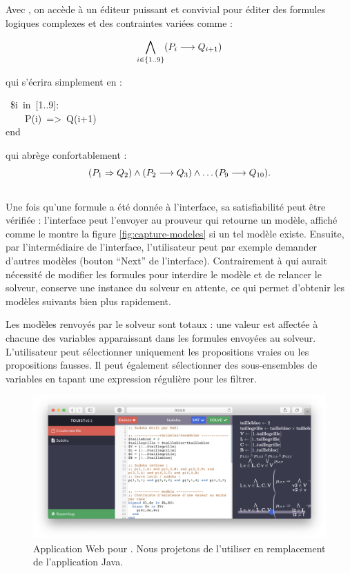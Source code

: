 Avec \touist , on accède à un éditeur puissant et convivial pour éditer des formules logiques complexes et des contraintes variées comme :

\[\bigwedge_{i \in \{1..9\}} (P_i \longrightarrow Q_{i+1})\]

\noindent
qui s'écrira simplement en \touist :
\begin{mdpre}%
~{\$i}~{in}~{}[{1}..{9}]:\\
~~~~P(i)~=\textgreater{}~Q(i+{1})\\
{end}%
\end{mdpre}%

\noindent
qui abrège confortablement :\\

\[(P_1 \Rightarrow Q_2) \wedge (P_2 \longrightarrow Q_3) \wedge \ldots (P_9\longrightarrow Q_{10}).\] 
\\


Une fois qu'une formule a été donnée à l'interface, sa satisfiabilité peut être vérifiée : l'interface peut l'envoyer au prouveur qui retourne un modèle, affiché comme le montre la figure \ref{fig:capture-modeles} si un tel modèle existe. Ensuite, par l'intermédiaire de l'interface, l'utilisateur peut par exemple demander d'autres modèles (bouton \enquote{Next} de l'interface). Contrairement à \satoulouse qui aurait nécessité de modifier les formules pour interdire le modèle et de relancer le solveur, \touist conserve une instance du solveur en attente, ce qui permet d'obtenir les modèles suivants bien plus rapidement.

Les modèles renvoyés par le solveur sont totaux : une valeur est affectée à chacune des variables apparaissant dans les formules envoyées au solveur. L'utilisateur peut sélectionner uniquement les propositions vraies ou les propositions fausses. Il peut également sélectionner des sous-ensembles de variables en tapant une expression régulière pour les filtrer.


\begin{figure}[!ht] \centering
  \includegraphics[width=1\textwidth]{figures/touist-web}
  \caption{Application Web pour \touist. Nous projetons de l'utiliser en remplacement de l'application Java.} \label{fig:touist-web}
\end{figure}

